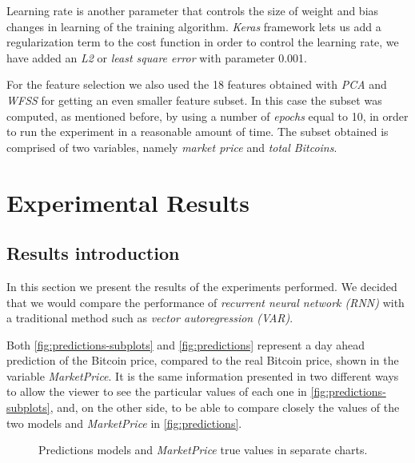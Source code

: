 Learning rate is another parameter that controls the size of weight
and bias changes in learning of the training algorithm. \textit{Keras}
framework lets us add a regularization term to the cost function in
order to control the learning rate, we have added an \textit{L2} or
\textit{least square error} with parameter 0.001.


For the feature selection we also used the 18 features obtained with
\textit{PCA} and \textit{WFSS} for getting an even smaller feature
subset. In this case the subset was computed, as mentioned before, by
using a number of \textit{epochs} equal to 10, in order to run the
experiment in a reasonable amount of time. The subset obtained is
comprised of two variables, namely \textit{market price} and
\textit{total Bitcoins}.
\chapter{Experimental Results}
\label{ch:experimental-results}

\section{Results introduction}
\label{sec:result-presentation}

In this section we present the results of the experiments performed.
We decided that we would compare the performance of \textit{recurrent
neural network (RNN)} with a traditional method such as \textit{vector
autoregression (VAR)}.

Both \autoref{fig:predictions-subplots} and \autoref{fig:predictions}
represent a day ahead prediction of the Bitcoin price, compared to the
real Bitcoin price, shown in the variable \textit{MarketPrice}. It is
the same information presented in two different ways to allow the
viewer to see the particular values of each one in
\autoref{fig:predictions-subplots}, and, on the other side, to be able
to compare closely the values of the two models and
\textit{MarketPrice} in \autoref{fig:predictions}.

\begin{figure}[bth]
  \caption{Predictions models and \textit{MarketPrice} true values in
    separate charts.}
  \label{fig:predictions-subplots}
\end{figure}

